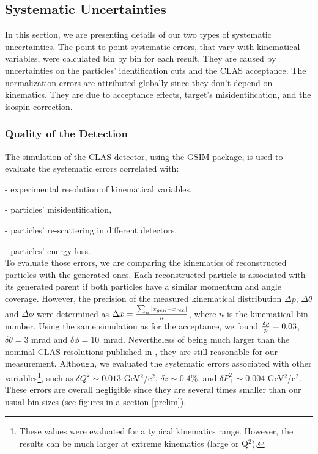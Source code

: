 \subsection{Systematic Uncertainties}
\label{sec:TotSys}

In this section, we are presenting details of our two types of systematic uncertainties. The point-to-point systematic errors, that vary with kinematical variables, were calculated bin by bin for each result. They are caused by uncertainties on the particles' identification cuts and the CLAS acceptance. The normalization errors are attributed globally since they don't depend on kinematics. They are due to acceptance effects, target's misidentification, and the isospin correction.

\subsubsection{Quality of the Detection}
\label{SysId}

The simulation of the CLAS detector, using the GSIM package, is used 
to evaluate the systematic errors correlated with:

  - experimental resolution of kinematical variables,

  - particles' misidentification,

  - particles' re-scattering in different detectors,

  - particles' energy loss.\\


To evaluate those errors, we are comparing the kinematics of reconstructed particles with the generated ones. Each reconstructed particle is associated with its generated parent if both particles have a similar momentum and angle coverage. However, the precision of the measured kinematical distribution $\Delta p$, $\Delta \theta$ and $\Delta \phi$ were determined as $\Delta x = {\sum_n |x_{gen} - x_{rec}| \over n}$, where $n$ is the kinematical bin number. Using the same simulation as for the acceptance, we found ${\delta p \over p } = 0.03$, $\delta \theta = 3$ mrad and $\delta \phi = 10$~mrad. Nevertheless of being much larger than the nominal CLAS resolutions published in \cite{Mecking:2003zu}, they are still reasonable for our measurement. Although, we evaluated the systematic errors associated with other variables\footnote{These values were evaluated for a typical kinematics range. However, the results can be much larger at extreme kinematics (large \pt or Q$^2$).}, such as $\delta Q^2 \sim 0.013$ GeV$^2$/c$^2$, $\delta z \sim 0.4 \%$, and $\delta P_\perp^2 \sim 0.004$ GeV$^2$/c$^2$. These errors are overall negligible since they are several times smaller than our usual bin sizes (see figures in a section \ref{prelim}). 

